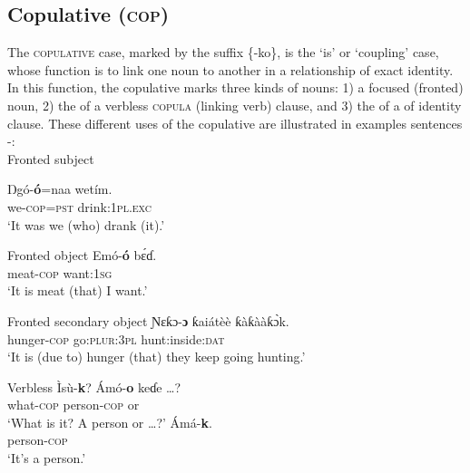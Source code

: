 \subsection{Copulative (\textsc{cop})}\label{sec:7.8}


The \textsc{copulative} case, marked by the suffix \{-ko\}, is the ‘is’ or ‘coupling’ case, whose function is to link one noun to another in a relationship of exact identity. In this function, the copulative marks three kinds of nouns: 1) a focused (fronted) noun, 2) the  of a verbless \textsc{copula} (linking verb) clause, and 3) the  of a  of identity clause. These different uses of the copulative are illustrated in examples sentences -:\\





Fronted subject


\ea\label{ex:case:37}
\gll Ŋ{gó-}\textbf{ó}=naa   wetím. \\
 we-\textsc{cop}=\textsc{pst}   drink:\textsc{1pl.exc}   \\
\glt ‘It was we (who) drank (it).’ 
\z




Fronted object
\ea\label{ex:case:38}
\gll Emó-\textbf{ó}     b\'{ɛ}ɗ{\Í}. \\
meat-\textsc{cop}   want:\textsc{1sg}    \\
\glt ‘It is meat (that) I want.’ 
\z




Fronted secondary object
\ea\label{ex:case:39}
\gll Ɲɛƙɔ{-}\textbf{ɔ}     ƙaiátèè   ƙàƙààƙ\`{ɔ}k\ᵋ. \\
hunger-\textsc{cop}   go:\textsc{plur:3pl}   hunt:inside:\textsc{dat}    \\
\glt ‘It is (due to) hunger (that) they keep going hunting.’ 
\z





Verbless  
\ea\label{ex:case:40}
  \ea
  \gll Ìsù-\textbf{k\ᵒ}?   Ámó-\textbf{o}   keɗe {\dots}?\\
what-\textsc{cop}   person-\textsc{cop}   or     \\   
  \glt ‘What is it? A person or {\dots}?'
  \ex
  \gll Ámá-\textbf{k\ᵒ}. \\
person-\textsc{cop}    \\
  \glt `It’s a person.’
  \z
\z




